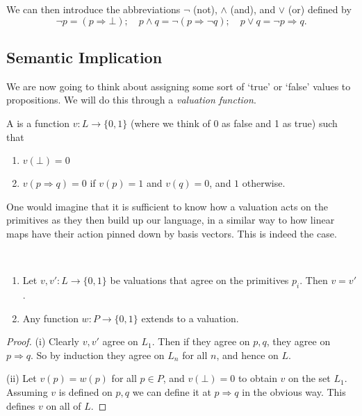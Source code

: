 \documentclass[a4paper]{scrartcl}
\begin{document}
We can then introduce the abbreviations $\lnot$ (not), $\land$ (and), and $\lor$ (or) defined by 
$$
\lnot p = (p \Rightarrow \bot); \quad p \land q = \lnot(p \Rightarrow \lnot q); \quad p \lor q = \lnot p \Rightarrow q.
$$

\subsection{Semantic Implication}

We are now going to think about assigning some sort of `true' or `false' values to propositions. We will do this through a \emph{valuation function}.

\begin{definition}[Valuation]
  A  is a function $v : L \rightarrow \{0, 1\}$ (where we think of $0$ as false and 1 as true) such that
  \begin{enumerate}
    \item $v(\bot) = 0$
    \item $v(p \Rightarrow q) = 0$ if $v(p) = 1$ and $v(q) = 0$, and $1$ otherwise.
  \end{enumerate}
\end{definition}


One would imagine that it is sufficient to know how a valuation acts on the primitives as they then build up our language, in a similar way to how linear maps have their action pinned down by basis vectors. This is indeed the case.

\begin{proposition}~
  \vspace{-1.5\baselineskip}
  \begin{enumerate}[label=(\roman*)]
    \item Let $v, v' : L \rightarrow \{0, 1\}$ be valuations that agree on the primitives $p_i$. Then $v = v'$.
    \item Any function $w: P \rightarrow \{0, 1\}$ extends to a valuation.
  \end{enumerate}
\end{proposition}
\begin{proof}(i) Clearly $v, v'$ agree on $L_1$. Then if they agree on $p, q$, they agree on $p \Rightarrow q$. So by induction they agree on $L_n$ for all $n$, and hence on $L$.

  (ii) Let $v(p) = w(p)$ for all $p \in P$, and $v(\bot) = 0$ to obtain $v$ on the set $L_1$. Assuming $v$ is defined on $p, q$ we can define it at $p\Rightarrow q$ in the obvious way. This defines $v$ on all of $L$.
\end{proof}
\end{document}

